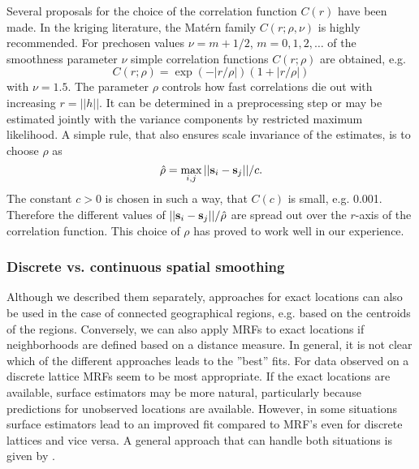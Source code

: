 \documentclass[11pt,a4paper,twoside]{bayesxarticle}
\begin{document}
Several proposals for the choice of the correlation function
$C(r)$ have been made. In the kriging literature, the Mat\'{e}rn
family $C(r;\rho,\nu)$ is highly recommended. For prechosen values $\nu=m+1/2$,
$m=0,1,2,\ldots$ of the smoothness parameter $\nu$ simple
correlation functions $C(r;\rho)$ are obtained, e.g.
\[C(r;\rho)=\exp(-|r/\rho|)(1+|r/\rho|)\]
with $\nu=1.5$. The parameter $\rho$ controls how fast correlations
die out with increasing $r=||h||$. It can be determined in a
preprocessing step or may be estimated jointly with the variance
components by restricted maximum likelihood. A simple rule, that
also ensures scale invariance of the estimates, is to choose $\rho$
as
\[\hat{\rho}=\max_{i,j}||\mathbf{s}_i-\mathbf{s}_j||/c.\]
The constant $c>0$ is chosen in such a way, that $C(c)$ is small,
e.g. 0.001. Therefore the different values of
$||\mathbf{s}_i-\mathbf{s}_j||/\hat{\rho}$ are spread out over the $r$-axis of
the correlation function. This choice of $\rho$ has proved to work
well in our experience.

\subsubsection{Discrete vs. continuous spatial smoothing}

Although we described them separately, approaches for exact locations can also be used in the case of connected geographical
regions, e.g. based on the centroids of the regions. Conversely, we can also apply MRFs to exact locations if neighborhoods are
defined based on a distance measure. In general, it is not clear which of the different approaches leads to the ''best'' fits.
For data observed on a discrete lattice MRFs seem to be most appropriate. If the exact locations are available, surface
estimators may be more natural, particularly because predictions for unobserved locations are available. However, in some
situations surface estimators lead to an improved fit compared to MRF's even for discrete lattices and vice versa. A general
approach that can handle both situations is given by .
\end{document}
